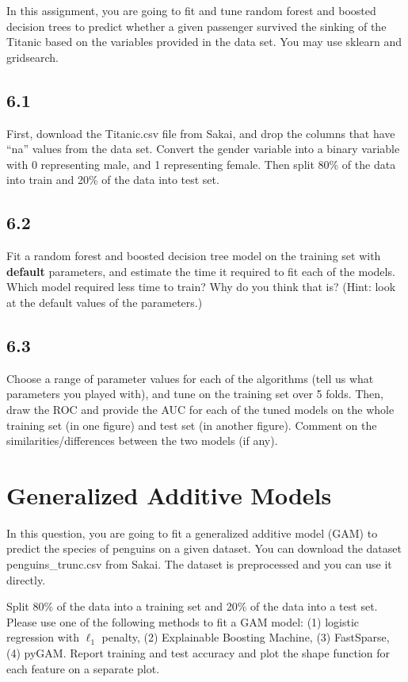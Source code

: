 \documentclass{exam}
\begin{document}
In this assignment, you are going to fit and tune random forest and boosted decision trees to predict whether a given passenger survived the sinking of the Titanic based on the variables provided in the data set. You may use sklearn and gridsearch. 

\subsection*{6.1}

First, download the Titanic.csv file from Sakai, and drop the columns that have ``na'' values from the data set. Convert the gender variable into a binary variable with 0 representing male, and 1 representing female. Then split 80\% of the data into train and 20\% of the data into test set. 

\subsection*{6.2}

Fit a random forest and boosted decision tree model on the training set with \textbf{default} parameters, and estimate the time it required to fit each of the models. Which model required less time to train? Why do you think that is? (Hint: look at the default values of the parameters.)

\subsection*{6.3}

 Choose a range of parameter values for each of the algorithms (tell us what parameters you played with), and tune on the training set over 5 folds. Then, draw the ROC and provide the AUC for each of the tuned models on the whole training set (in one figure) and test set (in another figure). Comment on the similarities/differences between the two models (if any).

\section{Generalized Additive Models}
In this question, you are going to fit a generalized additive model (GAM) to predict the species of penguins on a given dataset. You can download the dataset penguins\_trunc.csv from Sakai. The dataset is preprocessed and you can use it directly. 

Split 80\% of the data into a training set and 20\% of the data into a test set. 
Please use one of the following methods to fit a GAM model: (1) logistic regression with $\ell_1$ penalty, (2) Explainable Boosting Machine, (3) FastSparse, (4) pyGAM. Report training and test accuracy and plot the shape function for each feature on a separate plot. 
\end{document}

